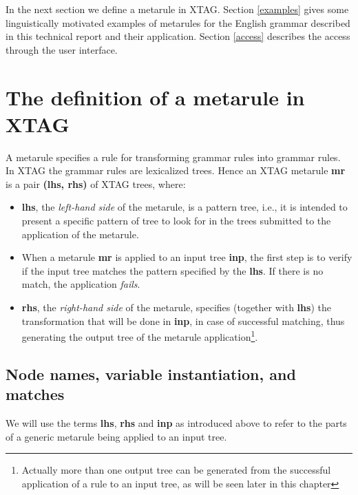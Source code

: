 In the next section we define a metarule in XTAG. 
Section \ref{examples} gives some 
linguistically motivated examples 
of metarules for the English grammar described in this 
technical report and their application. Section \ref{access} 
describes the access through 
the user interface. 
 
\section{The definition of a metarule in XTAG} 
\label{definition} 
 
A metarule specifies a rule for transforming grammar rules into grammar rules. 
In XTAG the grammar 
rules are lexicalized trees. Hence an XTAG metarule {\bf mr} 
is a pair {\bf (lhs, rhs)} of XTAG trees, where: 
 
\begin{itemize} 
\item {\bf lhs}, the {\it left-hand side} of the metarule, is a pattern tree, 
        i.e., it is intended to present a specific pattern of tree to look for 
        in the trees submitted to the application of the metarule. 
 
\item When a metarule {\bf mr} is applied to an input tree {\bf inp}, the first 
        step is to verify if the input tree matches the pattern specified by 
        the {\bf lhs}. If there is no match, the application {\it fails}. 
 
\item {\bf rhs}, the {\it right-hand side} of the metarule, specifies (together 
        with {\bf lhs}) the transformation that will be done in {\bf inp}, 
        in case of successful matching, thus generating the output tree of 
        the metarule application\footnote{Actually more than one output tree         can be generated from the successful application of a rule to an         input tree, as will be seen later in this chapter}. 
\end{itemize} 
 
\subsection{Node names, variable instantiation, and matches} 
 
We will use the terms {\bf lhs}, {\bf rhs} and {\bf inp} as introduced above 
to refer to the parts of a generic metarule being applied to an input tree. 
 

